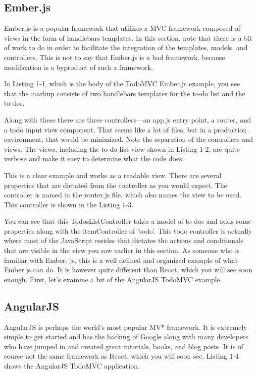 \subsection{Ember.js}

Ember.js is a popular framework that utilizes a MVC framework composed of views in the form of handlebars templates. In this section, note that there is a bit of work to do in order to facilitate the integration of the templates, models, and controllers. This is not to say that Ember.js is a bad framework, because modification is a byproduct of such a framework.

In Listing 1-1, which is the body of the TodoMVC Ember.js example, you see that the markup consists of two handlebars templates for the to-do list and the to-dos.

Along with these there are three controllers—an app.js entry point, a router,
and a todo input view component. That seems like a lot of files, but in a production environment, that would be minimized. Note the separation of the controllers and views. The views, including the to-do list view shown in Listing 1-2, are quite verbose and make it easy to determine what the code does.


This is a clear example and works as a readable view. There are several properties that are dictated from the controller as you would expect. The controller is named in the router.js file, which also names the view to be used. This controller is shown in the Listing 1-3.

You can see that this TodosListController takes a model of to-dos and adds some properties along with the itemController of 'todo'. This todo controller is actually where most of the JavaScript resides that dictates the actions and conditionals that are visible in the view you saw earlier in this section. As someone who is familiar with Ember. js, this is a well defined and organized example of what Ember.js can do. It is however quite different than React, which you will see soon enough. First, let’s examine a bit of the AngularJS TodoMVC example.

\subsection{AngularJS}

AngularJS is perhaps the world’s most popular MV* framework. It is extremely simple to get started and has the backing of Google along with many developers who have jumped in and created great tutorials, books, and blog posts. It is of course not the same framework as React, which you will soon see. Listing 1-4 shows the AngularJS TodoMVC application.

